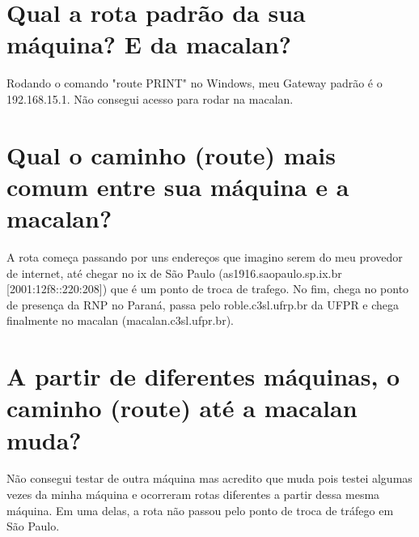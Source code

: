 \documentclass{article}
\begin{document}
\section{Qual a rota padrão da sua máquina? E da macalan?}
Rodando o comando "route PRINT" no Windows, meu Gateway padrão é o 192.168.15.1. Não consegui acesso para rodar na macalan.

\section{Qual o caminho (route) mais comum entre sua máquina e a macalan?}
A rota começa passando por uns endereços que imagino serem do meu provedor de internet, até chegar no ix de São Paulo (as1916.saopaulo.sp.ix.br [2001:12f8::220:208]) que é um ponto de troca de trafego.
No fim, chega no ponto de presença da RNP no Paraná, passa pelo roble.c3sl.ufrp.br da UFPR e chega finalmente no macalan (macalan.c3sl.ufpr.br). 

\section{A partir de diferentes máquinas, o caminho (route) até a macalan muda?}
Não consegui testar de outra máquina mas acredito que muda pois testei algumas vezes da minha máquina e ocorreram rotas diferentes a partir dessa mesma máquina. Em uma delas, a rota não passou pelo ponto de troca de tráfego em São Paulo.
\end{document}
